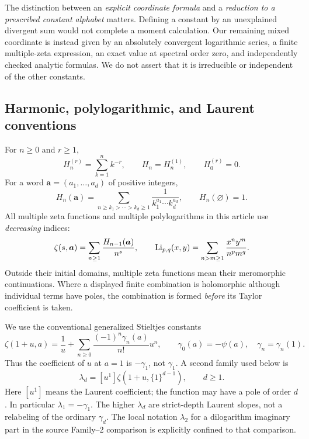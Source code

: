 The distinction between an \emph{explicit coordinate formula} and a
\emph{reduction to a prescribed constant alphabet} matters.  Defining a
constant by an unexplained divergent sum would not complete a moment
calculation.  Our remaining mixed coordinate is instead given by an
absolutely convergent logarithmic series, a finite multiple-zeta
expression, an exact value at spectral order zero, and independently
checked analytic formulas.  We do not assert that it is irreducible or
independent of the other constants.

\subsection{Harmonic, polylogarithmic, and Laurent conventions}

For $n\ge0$ and $r\ge1$,
\[
 H_n^{(r)}=\sum_{k=1}^n k^{-r},\qquad H_n=H_n^{(1)},
 \qquad H_0^{(r)}=0.
\]
For a word $\boldsymbol a=(a_1,\ldots,a_d)$ of positive integers,
\[
 H_n(\boldsymbol a)=\sum_{n\ge k_1>\cdots>k_d\ge1}
             \frac1{k_1^{a_1}\cdots k_d^{a_d}},
 \qquad H_n(\varnothing)=1.
\]
All multiple zeta functions and multiple polylogarithms in this article
use \emph{decreasing} indices:
\[
 \zeta(s,\boldsymbol a)=\sum_{n\ge1}\frac{H_{n-1}(\boldsymbol a)}{n^s},
 \qquad
 \operatorname{Li}_{p,q}(x,y)=\sum_{n>m\ge1}\frac{x^ny^m}{n^pm^q}.
\]
Outside their initial domains, multiple zeta functions mean their
meromorphic continuations.  Where a displayed finite combination is
holomorphic although individual terms have poles, the combination is
formed \emph{before} its Taylor coefficient is taken.

We use the conventional generalized Stieltjes constants
\begin{equation}\label{scope:stieltjes}
 \zeta(1+u,a)=\frac1u+
       \sum_{n\ge0}\frac{(-1)^n\gamma_n(a)}{n!}u^n,
 \qquad \gamma_0(a)=-\psi(a),\quad \gamma_n=\gamma_n(1).
\end{equation}
Thus the coefficient of $u$ at $a=1$ is $-\gamma_1$, not
$\gamma_1$.  A second family used below is
\begin{equation}\label{scope:lambda}
 \lambda_d=[u^1]\zeta(1+u,\{1\}^{d-1}),\qquad d\ge1.
\end{equation}
Here $[u^1]$ means the Laurent coefficient; the function may have a pole
of order $d$.  In particular $\lambda_1=-\gamma_1$.
The higher $\lambda_d$ are strict-depth Laurent slopes, not a relabeling
of the ordinary $\gamma_d$.  The local notation $\lambda_2$ for a
dilogarithm imaginary part in the source Family--2 comparison is
explicitly confined to that comparison.

